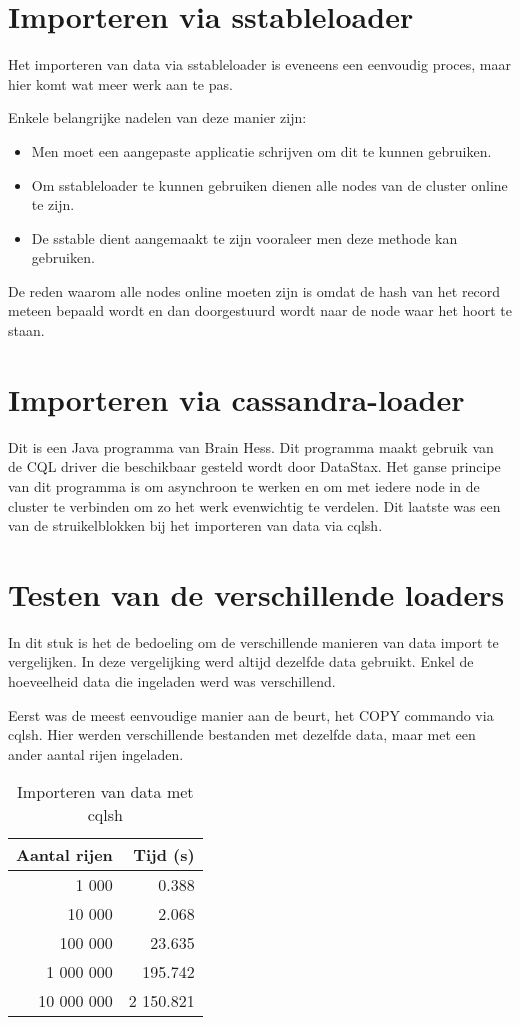 \section{Importeren via sstableloader}

Het importeren van data via sstableloader is eveneens een eenvoudig proces, maar hier komt wat meer werk aan te pas.

Enkele belangrijke nadelen van deze manier zijn:
\begin{itemize}
	\item Men moet een aangepaste applicatie schrijven om dit te kunnen gebruiken.
	\item Om sstableloader te kunnen gebruiken dienen alle nodes van de cluster online te zijn.
	\item De sstable dient aangemaakt te zijn vooraleer men deze methode kan gebruiken.
\end{itemize}

De reden waarom alle nodes online moeten zijn is omdat de hash van het record meteen bepaald wordt en dan doorgestuurd wordt naar de node waar het hoort te staan.

\section{Importeren via cassandra-loader}
Dit is een Java programma van Brain Hess.
Dit programma maakt gebruik van de CQL driver die beschikbaar gesteld wordt door DataStax.
Het ganse principe van dit programma is om asynchroon te werken en om met iedere node in de cluster te verbinden om zo het werk evenwichtig te verdelen.
Dit laatste was een van de struikelblokken bij het importeren van data via cqlsh.

\section{Testen van de verschillende loaders}
In dit stuk is het de bedoeling om de verschillende manieren van data import te vergelijken.
In deze vergelijking werd altijd dezelfde data gebruikt.
Enkel de hoeveelheid data die ingeladen werd was verschillend.

Eerst was de meest eenvoudige manier aan de beurt, het COPY commando via cqlsh.
Hier werden verschillende bestanden met dezelfde data, maar met een ander aantal rijen ingeladen.

\begin{table}[H]
	\centering
	\begin{tabular}{|r|r|}
		\hline
		Aantal rijen & Tijd (s) \\
		\hline
		\hline
		1 000 & 0.388 \\
		\hline
		10 000 & 2.068 \\
		\hline
		100 000 & 23.635 \\
		\hline
		1 000 000 & 195.742 \\
		\hline
		10 000 000 & 2 150.821\\
		\hline
	\end{tabular}
	\caption{Importeren van data met cqlsh}
	\label{tab:cas_cqlsh}
\end{table}

